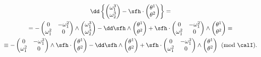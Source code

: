 \begin{multline}
    \dd \left\{
        \begin{pmatrix}
            \omega_1^3\\\omega_2^3
        \end{pmatrix}
        -\sfh\cdot 
        \begin{pmatrix}
            \theta^1\\\theta^2
        \end{pmatrix}
    \right\}=\\
    =-\begin{pmatrix}
        0&-\omega_1^2\\
        \omega_1^2& 0
    \end{pmatrix}\wedge 
    \begin{pmatrix}
        \omega_1^3\\\omega_2^3
    \end{pmatrix}
    -\dd \sfh\wedge 
    \begin{pmatrix}
        \theta^1\\\theta^2
    \end{pmatrix}
    +\sfh \cdot\begin{pmatrix}
        0&-\omega_1^2\\
        \omega_1^2& 0
    \end{pmatrix}\wedge 
    \begin{pmatrix}
        \theta^1\\\theta^2
    \end{pmatrix} \equiv 
    \\
    \equiv
    -\begin{pmatrix}
        0&-\omega_1^2\\
        \omega_1^2& 0
    \end{pmatrix}\wedge \sfh\cdot
    \begin{pmatrix}
        \theta^1 \\ \theta^2
    \end{pmatrix}
    -\dd \sfh\wedge 
    \begin{pmatrix}
        \theta^1\\\theta^2
    \end{pmatrix}
    +\sfh\cdot \begin{pmatrix}
        0&-\omega_1^2\\
        \omega_1^2& 0
    \end{pmatrix}\wedge 
    \begin{pmatrix}
        \theta^1\\\theta^2
    \end{pmatrix}\pmod{\calI}.\label{eq I^1_taut structure}
\end{multline}
